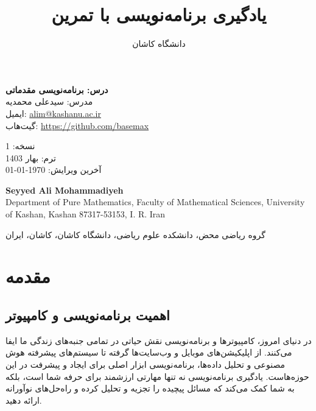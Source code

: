 \documentclass[a4paper,12pt]{article}
\begin{document}
	\title{یادگیری برنامه‌نویسی با تمرین}
	\author{دانشگاه کاشان}
	\date{}
	\maketitle
	\thispagestyle{empty}
	
	\begin{center}
		\textbf{درس: برنامه‌نویسی مقدماتی}\\
		مدرس: سیدعلی محمدیه\\
		ایمیل: \href{mailto:alim@kashanu.ac.ir}{alim@kashanu.ac.ir}\\
		گیت‌هاب: \url{https://github.com/basemax}\\

		\vspace{1cm}
		
	نسخه: 1\\
			ترم: بهار 1403  \\
				آخرین ویرایش: \today\\
				
		\vspace{1cm}


		\begin{LTR}
			\textbf{Seyyed Ali Mohammadiyeh}\\
			Department of Pure Mathematics, Faculty of Mathematical Sciences, University of Kashan, Kashan 87317-53153, I. R. Iran		
		\end{LTR}
		
				گروه ریاضی محض، دانشکده علوم ریاضی، دانشگاه کاشان، کاشان، ایران\\
	\end{center}
	
	
	\newpage
	\section*{مقدمه}
	
	\subsection*{اهمیت برنامه‌نویسی و کامپیوتر}
	در دنیای امروز، کامپیوترها و برنامه‌نویسی نقش حیاتی در تمامی جنبه‌های زندگی ما ایفا می‌کنند. از اپلیکیشن‌های موبایل و وب‌سایت‌ها گرفته تا سیستم‌های پیشرفته هوش مصنوعی و تحلیل داده‌ها، برنامه‌نویسی ابزار اصلی برای ایجاد و پیشرفت در این حوزه‌هاست. یادگیری برنامه‌نویسی نه تنها مهارتی ارزشمند برای حرفه شما است، بلکه به شما کمک می‌کند که مسائل پیچیده را تجزیه و تحلیل کرده و راه‌حل‌های نوآورانه ارائه دهید.
	
\end{document}
